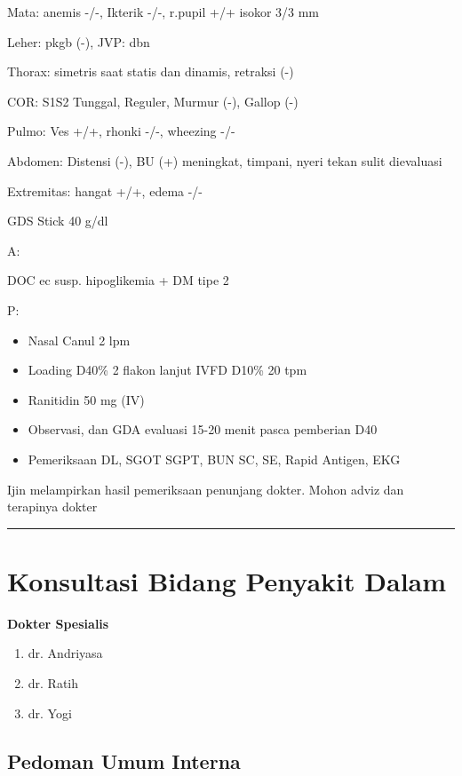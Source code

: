 \documentclass[
]{book}
\providecommand{\tightlist}{%
  \setlength{\itemsep}{0pt}\setlength{\parskip}{0pt}}
\begin{document}
Mata: anemis -/-, Ikterik -/-, r.pupil +/+ isokor 3/3 mm

Leher: pkgb (-), JVP: dbn

Thorax: simetris saat statis dan dinamis, retraksi (-)

COR: S1S2 Tunggal, Reguler, Murmur (-), Gallop (-)

Pulmo: Ves +/+, rhonki -/-, wheezing -/-

Abdomen: Distensi (-), BU (+) meningkat, timpani, nyeri tekan sulit dievaluasi

Extremitas: hangat +/+, edema -/-

GDS Stick 40 g/dl

A:

DOC ec susp. hipoglikemia + DM tipe 2

P:

\begin{itemize}
\tightlist
\item
  Nasal Canul 2 lpm
\item
  Loading D40\% 2 flakon lanjut IVFD D10\% 20 tpm
\item
  Ranitidin 50 mg (IV)
\item
  Observasi, dan GDA evaluasi 15-20 menit pasca pemberian D40
\item
  Pemeriksaan DL, SGOT SGPT, BUN SC, SE, Rapid Antigen, EKG
\end{itemize}

Ijin melampirkan hasil pemeriksaan penunjang dokter.
Mohon adviz dan terapinya dokter

\begin{center}\rule{0.5\linewidth}{0.5pt}\end{center}

\hypertarget{konsultasi-bidang-penyakit-dalam}{%
\section{Konsultasi Bidang Penyakit Dalam}\label{konsultasi-bidang-penyakit-dalam}}

\textbf{Dokter Spesialis}

\begin{enumerate}
\def\labelenumi{\arabic{enumi}.}
\tightlist
\item
  dr. Andriyasa
\item
  dr. Ratih
\item
  dr. Yogi
\end{enumerate}

\hypertarget{pedoman-umum-interna}{%
\subsection{Pedoman Umum Interna}\label{pedoman-umum-interna}}
\end{document}
